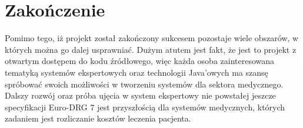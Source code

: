 \chapter{Zakończenie}
\label{cha:zakonczenie}

Pomimo tego, iż projekt został zakończony sukcesem pozostaje wiele obszarów, w których można go dalej usprawniać. Dużym atutem jest fakt, że jest to projekt z otwartym dostępem do kodu źródłowego, więc każda osoba zainteresowana tematyką systemów ekspertowych oraz technologii Java'owych ma szansę spróbować swoich możliwości w tworzeniu systemów dla sektora medycznego. Dalszy rozwój oraz próba ujęcia w system ekspertowy nie powstałej jeszcze specyfikacji Euro-DRG 7 jest przyszłością dla systemów medycznych, których zadaniem jest rozliczanie kosztów leczenia pacjenta.
